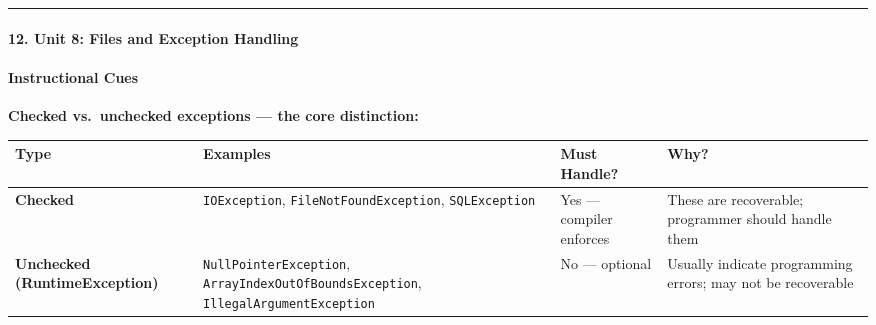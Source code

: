 \documentclass[
  justified,
  openright,
]{tufte-book}
\let\subsection\paragraph
\let\paragraph\paragraph
\let\subsection\paragraph
\let\paragraph\paragraph
\begin{document}
\begin{center}\rule{0.5\linewidth}{0.5pt}\end{center}

\subsection{12. Unit 8: Files and Exception
Handling}\label{unit-8-files-and-exception-handling}

\paragraph{Instructional Cues}\label{instructional-cues-30}

\textbf{Checked vs.~unchecked exceptions --- the core distinction:}

\begin{fullwidth}{\def\LTcaptype{none} %
\begin{longtable}[]{@{}
  >{\raggedright\arraybackslash}p{}
  >{\raggedright\arraybackslash}p{}
  >{\raggedright\arraybackslash}p{}
  >{\raggedright\arraybackslash}p{}@{}}
\toprule\noalign{}
\begin{minipage}[b]{\linewidth}\raggedright
Type
\end{minipage} & \begin{minipage}[b]{\linewidth}\raggedright
Examples
\end{minipage} & \begin{minipage}[b]{\linewidth}\raggedright
Must Handle?
\end{minipage} & \begin{minipage}[b]{\linewidth}\raggedright
Why?
\end{minipage} \\
\midrule\noalign{}
\endhead
\bottomrule\noalign{}
\endlastfoot
\textbf{Checked} & \texttt{IOException}, \texttt{FileNotFoundException},
\texttt{SQLException} & Yes --- compiler enforces & These are
recoverable; programmer should handle them \\
\textbf{Unchecked (RuntimeException)} & \texttt{NullPointerException},
\texttt{ArrayIndexOutOfBoundsException},
\texttt{IllegalArgumentException} & No --- optional & Usually indicate
programming errors; may not be recoverable \\
\end{longtable}
}
\end{fullwidth}
\end{document}
